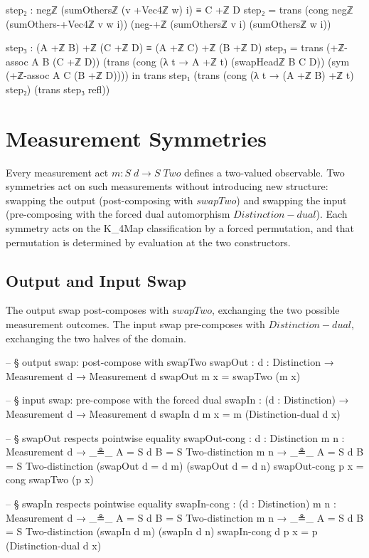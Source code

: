 \documentclass[11pt,a4paper]{book}
\def\texttt#1{#1}%
\def\text#1{#1}%
\begin{document}
\begin{code}
    step₂ : negℤ (sumOthersℤ (v +Vec4ℤ w) i) ≡ C +ℤ D
    step₂ =
      trans
        (cong negℤ (sumOthers-+Vec4ℤ v w i))
        (neg-+ℤ (sumOthersℤ v i) (sumOthersℤ w i))

    step₃ : (A +ℤ B) +ℤ (C +ℤ D) ≡ (A +ℤ C) +ℤ (B +ℤ D)
    step₃ =
      trans
        (+ℤ-assoc A B (C +ℤ D))
        (trans
          (cong (λ t → A +ℤ t) (swapHeadℤ B C D))
          (sym (+ℤ-assoc A C (B +ℤ D))))
  in
  trans
    step₁
    (trans
      (cong (λ t → (A +ℤ B) +ℤ t) step₂)
      (trans
        step₃
        refl))
\end{code}


\chapter{Measurement Symmetries}
\label{ch:measurement-symmetries}

Every measurement act $m : S\;d \to S\;\text{Two}$ defines a two-valued observable.
Two symmetries act on such measurements without introducing new structure:
swapping the output (post-composing with $\texttt{swapTwo}$) and swapping the
input (pre-composing with the forced dual automorphism $\texttt{Distinction-dual}$).
Each symmetry acts on the \texttt{K\_4Map} classification by a forced permutation,
and that permutation is determined by evaluation at the two constructors.

\section{Output and Input Swap}

The output swap post-composes with $\texttt{swapTwo}$, exchanging the two
possible measurement outcomes.  The input swap pre-composes with $\texttt{Distinction-dual}$,
exchanging the two halves of the domain.

\begin{code}
-- § output swap: post-compose with swapTwo
swapOut : {d : Distinction} → Measurement d → Measurement d
swapOut m x = swapTwo (m x)

-- § input swap: pre-compose with the forced dual
swapIn : (d : Distinction) → Measurement d → Measurement d
swapIn d m x = m (Distinction-dual d x)

-- § swapOut respects pointwise equality
swapOut-cong :
  {d : Distinction} {m n : Measurement d} →
  _≗_ {A = S d} {B = S Two-distinction} m n →
  _≗_ {A = S d} {B = S Two-distinction} (swapOut {d = d} m) (swapOut {d = d} n)
swapOut-cong p x = cong swapTwo (p x)

-- § swapIn respects pointwise equality
swapIn-cong :
  (d : Distinction) {m n : Measurement d} →
  _≗_ {A = S d} {B = S Two-distinction} m n →
  _≗_ {A = S d} {B = S Two-distinction} (swapIn d m) (swapIn d n)
swapIn-cong d p x = p (Distinction-dual d x)
\end{code}
\end{document}
